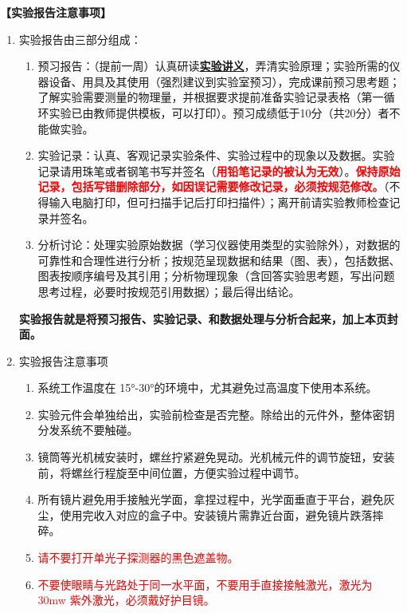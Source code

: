 \documentclass[dvipsnames, svgnames,a4paper,11pt]{article}
\begin{document}
\textbf{【实验报告注意事项】}
\begin{enumerate}
	\item 实验报告由三部分组成：
	\begin{enumerate}
		\item 预习报告：（提前一周）认真研读\underline{\textbf{实验讲义}}，弄清实验原理；实验所需的仪器设备、用具及其使用（强烈建议到实验室预习），完成课前预习思考题；了解实验需要测量的物理量，并根据要求提前准备实验记录表格（第一循环实验已由教师提供模板，可以打印）。预习成绩低于10分（共20分）者不能做实验。
	    \item 实验记录：认真、客观记录实验条件、实验过程中的现象以及数据。实验记录请用珠笔或者钢笔书写并签名（\textcolor{red}{\textbf{用铅笔记录的被认为无效}}）。\textcolor{red}{\textbf{保持原始记录，包括写错删除部分，如因误记需要修改记录，必须按规范修改。}}（不得输入电脑打印，但可扫描手记后打印扫描件）；离开前请实验教师检查记录并签名。
	    \item 分析讨论：处理实验原始数据（学习仪器使用类型的实验除外），对数据的可靠性和合理性进行分析；按规范呈现数据和结果（图、表），包括数据、图表按顺序编号及其引用；分析物理现象（含回答实验思考题，写出问题思考过程，必要时按规范引用数据）；最后得出结论。
	\end{enumerate}
	\textbf{实验报告就是将预习报告、实验记录、和数据处理与分析合起来，加上本页封面。}
	\item 实验报告注意事项
		\begin{enumerate}[label=\roman*.]
			\item 系统工作温度在 15°-30°的环境中，尤其避免过高温度下使用本系统。
			\item 实验元件会单独给出，实验前检查是否完整。除给出的元件外，整体密钥分发系统不要触碰。
			\item 镜筒等光机械安装时，螺丝拧紧避免晃动。光机械元件的调节旋钮，安装前，将螺丝行程旋至中间位置，方便实验过程中调节。
			\item 所有镜片避免用手接触光学面，拿捏过程中，光学面垂直于平台，避免灰尘，使用完收入对应的盒子中。安装镜片需靠近台面，避免镜片跌落摔碎。
			\item \textcolor{red}{请不要打开单光子探测器的黑色遮盖物。}
			\item \textcolor{red}{不要使眼睛与光路处于同一水平面，不要用手直接接触激光，激光为 30mw 紫外激光，必须戴好护目镜。}
		\end{enumerate}
\end{enumerate}
\end{document}
